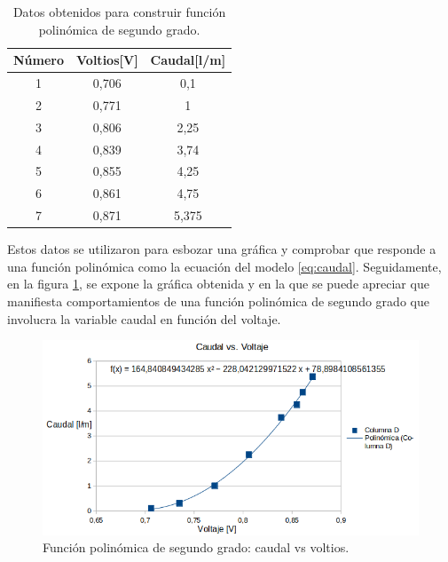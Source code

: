 \begin{table}[htpb]
	\centering
	\caption{Datos obtenidos para construir función polinómica de segundo grado.}
	\begin{tabular}{c c c }    
		\toprule
		\textbf{Número}   & \textbf{Voltios[V]} & \textbf{Caudal[l/m]}  \\
		\midrule
		1  & 0,706 & 0,1 \\
		2  & 0,771 & 1 \\
		3  & 0,806 & 2,25\\
		4  & 0,839 & 3,74 \\
		5  & 0,855 & 4,25  \\
		6  & 0,861 & 4,75 \\
		7  & 0,871 & 5,375 \\

		\bottomrule
		\hline
	\end{tabular}
	\label{tab:datos obtenidos para construir función polinómica de segundo grado.}
\end{table}
Estos datos se utilizaron para esbozar una gráfica y comprobar que responde a una función polinómica como la ecuación del modelo \ref{eq:caudal}. Seguidamente, en la figura \ref{fig:Función polinomica de segundo grado: caudal vs voltios}, se expone la gráfica obtenida y en la que se puede apreciar que manifiesta comportamientos de una función polinómica de segundo grado que involucra la variable caudal en función del voltaje.
 

\begin{figure}[H]
	\centering
	\includegraphics[scale=.60]{./Figures/FuncionPolinomicaCaudal-Voltaje.png}
	\caption{Función polinómica de segundo grado: caudal vs voltios.}
\label{fig:Función polinomica de segundo grado: caudal vs voltios}
\end{figure}



